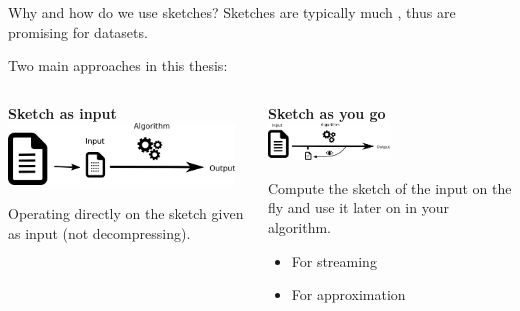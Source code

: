 \begin{frame}{Why and how do we use sketches?}
    Sketches are typically much , thus are promising for  datasets.
    
    \bigskip
    \pause


    \hspace{-0.5cm} {\large \textcolor{black!30!blue}{Two main approaches in this thesis:}}\\
    \begin{columns}
        \begin{framed}
            \begin{center}
                \textbf{Sketch as input}\\
                \medskip
                \includegraphics[width=0.95\textwidth]{pictures/sketch_as_input.png}
            \end{center}
            Operating directly on the sketch given as input (not decompressing).
        \end{framed}
        \begin{framed}
            \begin{center}
                \textbf{Sketch as you go}\\
                \smallskip
                \includegraphics[width=0.5\textwidth]{pictures/sketch_as_we_go.png}
            \end{center}
            Compute the sketch of the input on the fly and use it later on in your algorithm. 
            \begin{itemize}
                \item For streaming
                \item For approximation
            \end{itemize}
        \end{framed}
    \end{columns}
\end{frame}
